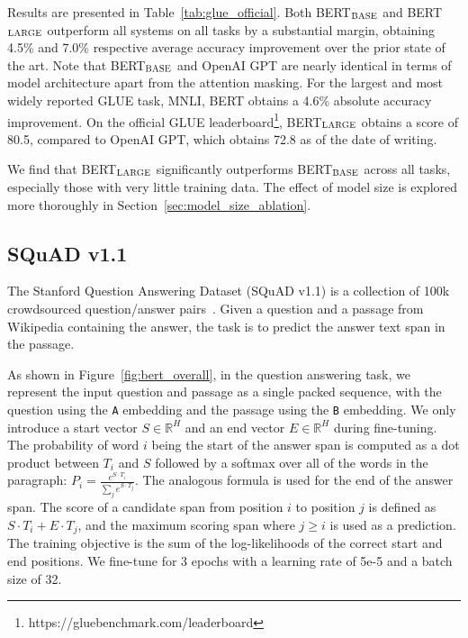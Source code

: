 \documentclass[11pt,a4paper]{article}
\newcommand{\eat}[1]{\ignorespaces}
\newcommand\bertbase{BERT$_{\small \textsc{BASE}}$\xspace}
\newcommand\bertlarge{BERT$_{\small \textsc{LARGE}}$\xspace}
\begin{document}
Results are presented in Table~\ref{tab:glue_official}. Both \bertbase and \bertlarge outperform all systems on all tasks by a substantial margin, obtaining 4.5\% and 7.0\% respective average accuracy improvement over the prior state of the art. Note that \bertbase and OpenAI GPT are nearly identical in terms of model architecture apart from the attention masking. For the largest and most widely reported GLUE task, MNLI, BERT obtains a 4.6\% absolute accuracy improvement. On the official GLUE leaderboard\footnote{https://gluebenchmark.com/leaderboard},
\bertlarge obtains a score of 80.5, compared to OpenAI GPT, which obtains 72.8 as of the date of writing.

We find that \bertlarge significantly outperforms \bertbase across all tasks, especially those with very little training data. The effect of model size is explored more thoroughly in Section~\ref{sec:model_size_ablation}.

\subsection{SQuAD v1.1}
\label{sec:squad}

The Stanford Question Answering Dataset (SQuAD v1.1) is a collection of 100k crowdsourced question/answer pairs~\cite{rajpurkar-etal:2016:_squad}. Given a question and a passage from Wikipedia containing the answer, the task is to predict the answer text span in the passage. 

\eat{
For example: 

\begin{itemize}
\item Input Question: \\{\tt {\scriptsize  Where do water droplets collide with ice crystals to form precipitation?}}
\item Input Paragraph: \\{\tt {\scriptsize  ... Precipitation forms as smaller droplets coalesce via collision with other rain drops or ice crystals within a cloud. ...}}
\item Output Answer: \\ {\tt {\scriptsize  within a cloud}}
\end{itemize}
}

As shown in Figure~\ref{fig:bert_overall}, in the question answering task,
we represent the input question and passage as a single packed sequence, with the question using the {\tt A} embedding and the passage using the {\tt B} embedding. We only introduce a start vector $S \in \mathbb{R}^H$ and an end vector $E \in \mathbb{R}^H$ during fine-tuning.
The probability of word $i$ being the start of the answer span is computed as a dot product between $T_i$ and $S$ followed by a softmax over all of the words in the paragraph: $P_i = \frac{e^{S{\cdot}T_i}}{\sum_j e^{S{\cdot}T_j}}$. The analogous formula is used for the end of the answer span. The score of a candidate span from position $i$ to position $j$ is defined as  $S{\cdot}T_i + E{\cdot}T_j$, and the maximum scoring span where $j \geq i$ is used as a prediction. The training objective is the sum of the log-likelihoods of the correct start and end positions. We fine-tune for 3 epochs with a learning rate of 5e-5 and a batch size of 32. 
\end{document}
